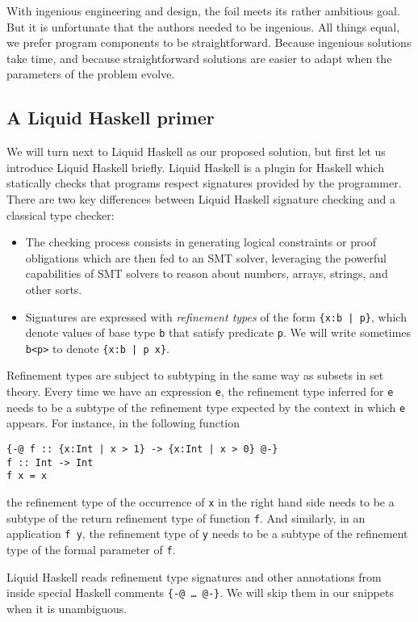 \documentclass[sigconf]{acmart}
\newcommand{\tc}[1]{{\small\texttt{#1}}}
\begin{document}
With ingenious engineering and design, the foil meets its rather ambitious goal.
But it is unfortunate that the authors needed to be ingenious. All things equal,
we prefer program components to be straightforward. Because ingenious solutions
take time, and because straightforward solutions are easier to adapt when the
parameters of the problem evolve.


\subsection{A Liquid Haskell primer}

We will turn next to Liquid Haskell as our proposed solution, but first let us
introduce Liquid Haskell briefly.
Liquid Haskell is a
plugin for Haskell which statically checks that programs respect signatures
provided by the programmer. There are two key differences between Liquid Haskell
signature checking and a classical type checker:

\begin{itemize}
  \item The checking process consists in generating logical constraints or proof
        obligations which are then fed to an SMT solver, leveraging the powerful
        capabilities of SMT solvers to reason about numbers, arrays, strings,
        and other sorts.
  \item Signatures are expressed with \emph{refinement types} of the form
        \tc{\{x:b | p\}}, which denote values of base type \tc{b} that
        satisfy predicate \tc{p}. We will write sometimes \tc{b<p>} to denote
        \tc{\{x:b | p x\}}.
\end{itemize}

Refinement types are subject to subtyping in the same way as subsets in set
theory. Every time we have an expression \tc{e}, the refinement
type inferred for \tc{e} needs to be a subtype of the refinement type expected by
the context in which \tc{e} appears. For instance, in the following function
\begin{verbatim}
{-@ f :: {x:Int | x > 1} -> {x:Int | x > 0} @-}
f :: Int -> Int
f x = x
\end{verbatim}
the refinement type of the occurrence of \tc{x} in the right hand side
needs to be a subtype of the return refinement type of function \tc{f}. And
similarly, in an application \tc{f y}, the refinement type of \tc{y} needs
to be a subtype of the refinement type of the formal parameter of \tc{f}.

Liquid Haskell reads refinement type signatures and other annotations from
inside special Haskell comments
\tc{\{-@ \ldots\ @-\}}. We will skip them in our snippets when it is unambiguous.
\end{document}
